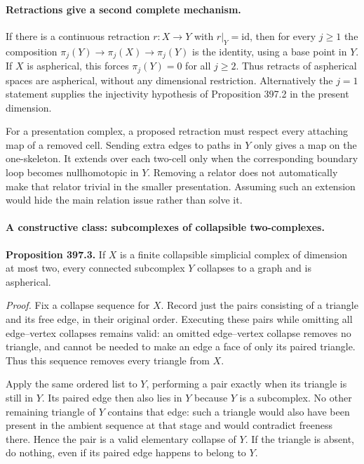 \documentclass[11pt]{article}
\begin{document}
\paragraph{Retractions give a second complete mechanism.}
If there is a continuous retraction $r:X\to Y$ with $r|_Y=\mathrm{id}$,
then for every $j\ge1$ the composition
$\pi_j(Y)\to\pi_j(X)\to\pi_j(Y)$ is the identity, using a base point
in $Y$. If $X$ is aspherical, this forces $\pi_j(Y)=0$ for all
$j\ge2$. Thus retracts of aspherical spaces are aspherical, without
any dimensional restriction. Alternatively the $j=1$ statement supplies
the injectivity hypothesis of Proposition 397.2 in the present dimension.

For a presentation complex, a proposed retraction must respect every
attaching map of a removed cell. Sending extra edges to paths in $Y$
only gives a map on the one-skeleton. It extends over each two-cell
only when the corresponding boundary loop becomes nullhomotopic in $Y$.
Removing a relator does not automatically make that relator trivial
in the smaller presentation. Assuming such an extension would hide
the main relation issue rather than solve it.

\paragraph{A constructive class: subcomplexes of collapsible two-complexes.}
\textbf{Proposition 397.3.} If $X$ is a finite collapsible simplicial
complex of dimension at most two, every connected subcomplex $Y$
collapses to a graph and is aspherical.

\emph{Proof.} Fix a collapse sequence for $X$. Record just the pairs
consisting of a triangle and its free edge, in their original order.
Executing these pairs while omitting all edge--vertex collapses remains
valid: an omitted edge--vertex collapse removes no triangle, and cannot
be needed to make an edge a face of only its paired triangle. Thus this
sequence removes every triangle from $X$.

Apply the same ordered list to $Y$, performing a pair exactly when its
triangle is still in $Y$. Its paired edge then also lies in $Y$ because
$Y$ is a subcomplex. No other remaining triangle of $Y$ contains that
edge: such a triangle would also have been present in the ambient
sequence at that stage and would contradict freeness there. Hence the
pair is a valid elementary collapse of $Y$. If the triangle is absent,
do nothing, even if its paired edge happens to belong to $Y$.
\end{document}
